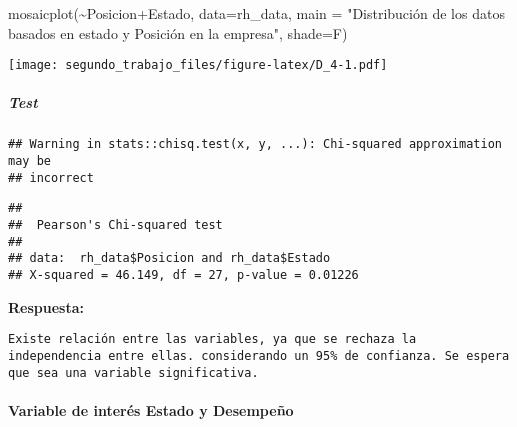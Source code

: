 \documentclass[
]{article}
\newenvironment{Shaded}{\begin{snugshade}}{\end{snugshade}}
\newcommand{\AttributeTok}[1]{\textcolor[rgb]{0.77,0.63,0.00}{#1}}
\newcommand{\DecValTok}[1]{\textcolor[rgb]{0.00,0.00,0.81}{#1}}
\newcommand{\FunctionTok}[1]{\textcolor[rgb]{0.00,0.00,0.00}{#1}}
\newcommand{\NormalTok}[1]{#1}
\newcommand{\SpecialCharTok}[1]{\textcolor[rgb]{0.00,0.00,0.00}{#1}}
\newcommand{\StringTok}[1]{\textcolor[rgb]{0.31,0.60,0.02}{#1}}
\begin{document}
\begin{Shaded}
\begin{Highlighting}[]
\FunctionTok{mosaicplot}\NormalTok{(}\SpecialCharTok{\textasciitilde{}}\NormalTok{Posicion}\SpecialCharTok{+}\NormalTok{Estado, }\AttributeTok{data=}\NormalTok{rh\_data, }\AttributeTok{main =} \StringTok{"Distribución de los datos basados en estado y Posición en la empresa"}\NormalTok{, }\AttributeTok{shade=}\NormalTok{F)}
\end{Highlighting}
\end{Shaded}

\texttt{[image: segundo\_trabajo\_files/figure-latex/D\_4-1.pdf]}

\hypertarget{test-1}{%
\subparagraph{Test}\label{test-1}}

\begin{Shaded}
\end{Shaded}

\begin{verbatim}
## Warning in stats::chisq.test(x, y, ...): Chi-squared approximation may be
## incorrect
\end{verbatim}

\begin{verbatim}
## 
##  Pearson's Chi-squared test
## 
## data:  rh_data$Posicion and rh_data$Estado
## X-squared = 46.149, df = 27, p-value = 0.01226
\end{verbatim}

\textbf{Respuesta:}

\begin{verbatim}
Existe relación entre las variables, ya que se rechaza la independencia entre ellas. considerando un 95% de confianza. Se espera que sea una variable significativa.
\end{verbatim}

\hypertarget{variable-de-interuxe9s-estado-y-desempeuxf1o}{%
\paragraph{Variable de interés Estado y
Desempeño}\label{variable-de-interuxe9s-estado-y-desempeuxf1o}}

\begin{Shaded}
\end{Shaded}
\end{document}

